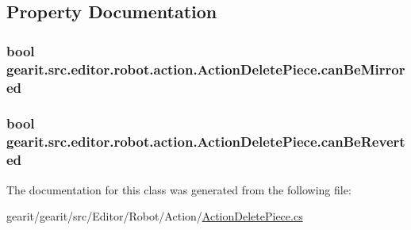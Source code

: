 \subsection{Property Documentation}
\hypertarget{classgearit_1_1src_1_1editor_1_1robot_1_1action_1_1_action_delete_piece_a2b962ffb4ab95c5195709de2023e1b58}{
\subsubsection[{can\+Be\+Mirrored}]{\setlength{\rightskip}{0pt plus 5cm}bool gearit.\+src.\+editor.\+robot.\+action.\+Action\+Delete\+Piece.\+can\+Be\+Mirrored\hspace{0.3cm}{\ttfamily [get]}}}\label{classgearit_1_1src_1_1editor_1_1robot_1_1action_1_1_action_delete_piece_a2b962ffb4ab95c5195709de2023e1b58}
\hypertarget{classgearit_1_1src_1_1editor_1_1robot_1_1action_1_1_action_delete_piece_a08da080ad7ba2c18e0ed072af7910c26}{
\subsubsection[{can\+Be\+Reverted}]{\setlength{\rightskip}{0pt plus 5cm}bool gearit.\+src.\+editor.\+robot.\+action.\+Action\+Delete\+Piece.\+can\+Be\+Reverted\hspace{0.3cm}{\ttfamily [get]}}}\label{classgearit_1_1src_1_1editor_1_1robot_1_1action_1_1_action_delete_piece_a08da080ad7ba2c18e0ed072af7910c26}


The documentation for this class was generated from the following file\+:\begin{DoxyCompactItemize}
\item 
gearit/gearit/src/\+Editor/\+Robot/\+Action/\hyperlink{_action_delete_piece_8cs}{Action\+Delete\+Piece.\+cs}\end{DoxyCompactItemize}
